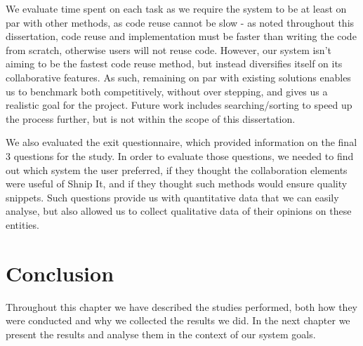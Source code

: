We evaluate time spent on each task as we require the system to be at least on par with other methods, as code reuse cannot be slow - as noted throughout this dissertation, code reuse and implementation must be faster than writing the code from scratch, otherwise users will not reuse code.
However, our system isn't aiming to be the fastest code reuse method, but instead diversifies itself on its collaborative features.
As such, remaining on par with existing solutions enables us to benchmark both competitively, without over stepping, and gives us a realistic goal for the project.
Future work includes searching/sorting to speed up the process further, but is not within the scope of this dissertation.

We also evaluated the exit questionnaire, which provided information on the final 3 questions for the study.
In order to evaluate those questions, we needed to find out which system the user preferred, if they thought the collaboration elements were useful of Shnip It, and if they thought such methods would ensure quality snippets.
Such questions provide us with quantitative data that we can easily analyse, but also allowed us to collect qualitative data of their opinions on these entities.

\section{Conclusion}
Throughout this chapter we have described the studies performed, both how they were conducted and why we collected the results we did. 
In the next chapter we present the results and analyse them in the context of our system goals.




